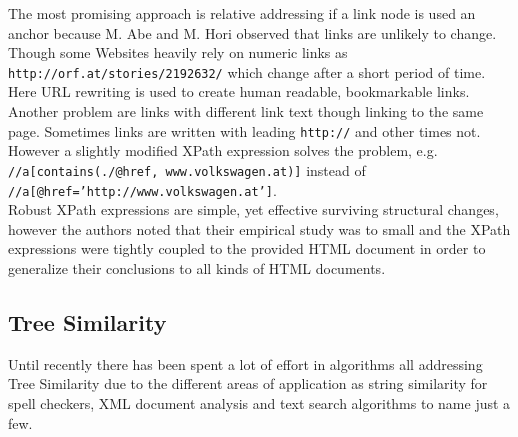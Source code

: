 \documentclass[12pt, notitlepage]{article}
\begin{document}
The most promising approach is relative addressing if a link node is used an anchor because M. Abe and M. Hori observed that links are unlikely to change. 
Though some Websites heavily rely on numeric links as \texttt{http://orf.at/stories/2192632/} which change after a short period of time. Here URL rewriting 
is used to create human readable, bookmarkable links. Another problem are links with different link text though linking to the same page. Sometimes links are written with leading \texttt{http://} and other times not. However a slightly modified XPath expression solves the problem, e.g.
\texttt{//a[contains(./@href, www.volkswagen.at)]} instead of \texttt{//a[@href='http://www.volkswagen.at']}.\\
Robust XPath expressions are simple, yet effective surviving structural changes, however the authors noted that their empirical study was to small and the XPath expressions were tightly coupled to the provided HTML document in order to generalize their conclusions to all kinds of HTML documents.  
\subsection{Tree Similarity}
Until recently there has been spent a lot of effort in algorithms all addressing Tree Similarity due to the different areas of application as string similarity for spell checkers,
XML document analysis and text search algorithms to name just a few.
\end{document}
